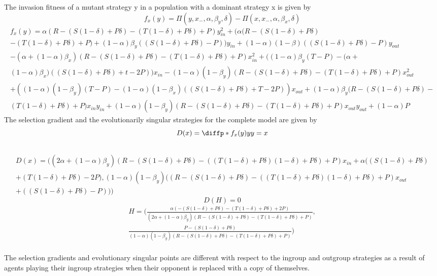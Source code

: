 \documentclass[]{llncs}
\begin{document}
The invasion fitness of a mutant strategy y in a population with a dominant strategy x is given by 
\[
f_x(y) = \Pi ( y, x_{-} , \alpha, \beta_y, \delta) - \Pi ( x, x_{-} , \alpha, \beta_x, \delta) 
\]
\begin{multline}
f_x(y) = \alpha (R - (S(1-\delta)+P\delta) -(T(1-\delta)+P\delta)+P) y_{in}^2 + (\alpha(R - (S(1-\delta)+P\delta) \\
-(T(1-\delta)+P\delta)+P) + (1-\alpha)\beta_y((S(1-\delta)+P\delta)-P))y_{in} + (1-\alpha)(1-\beta)((S(1-\delta)+P\delta)-P)y_{out} \\ 
- (\alpha + (1-\alpha)\beta_x)(R - (S(1-\delta)+P\delta) -(T(1-\delta)+P\delta)+P)x_{in}^2 + ((1-\alpha)\beta_y(T-P) - (\alpha+\\(1-\alpha)\beta_x)((S(1-\delta)+P\delta)+t-2P))x_{in} - (1-\alpha)(1-\beta_y)(R - (S(1-\delta)+P\delta) -(T(1-\delta)+P\delta)+P)x_{out}^2 \\+((1-\alpha)(1-\beta_y)(T-P) - (1-\alpha)(1-\beta_x)((S(1-\delta)+P\delta)+T-2P))x_{out} + (1-\alpha)\beta_y(R - (S(1-\delta)+P\delta) -\\(T(1-\delta)+P\delta)+P)x_{in}y_{in} + (1-\alpha)(1-\beta_y)(R - (S(1-\delta)+P\delta) -(T(1-\delta)+P\delta)+P)x_{out}y_{out} + (1-\alpha)P
\end{multline}
The selection gradient and the evolutionarily singular strategies for the complete model are given by
\[
D(x) = \diffp*{f_x(y)}{y}{y=x}
\]
\\
\begin{multline}
D(x) = ((2\alpha + (1-\alpha)\beta_y)(R - (S(1-\delta)+P\delta) -((T(1-\delta)+P\delta)(1-\delta)+P\delta)+ P) x_{in} + \alpha((S(1-\delta)+P\delta)\\+(T(1-\delta)+P\delta)-2P), (1-\alpha)(1-\beta_y)((R - (S(1-\delta)+P\delta) -((T(1-\delta)+P\delta)(1-\delta)+P\delta)+ P) x_{out} \\+ ((S(1-\delta)+P\delta)-P)))
\end{multline}
\[
D(H) = 0
\]
\begin{multline}
H = (\frac{\alpha(-(S(1-\delta)+P\delta)-(T(1-\delta)+P\delta)+2P)}{(2\alpha + (1-\alpha)\beta_y)(R - (S(1-\delta)+P\delta) - (T(1-\delta)+P\delta) + P)},\\ \frac{P-(S(1-\delta)+P\delta)}{(1-\alpha)(1-\beta_y)(R - (S(1-\delta)+P\delta) - (T(1-\delta)+P\delta) +P)}) 
\end{multline}
\\
The selection gradients and evolutionary singular points are different with respect to the ingroup and outgroup strategies as a result of agents playing their ingroup strategies when their opponent is replaced with a copy of themselves. 
\end{document}
